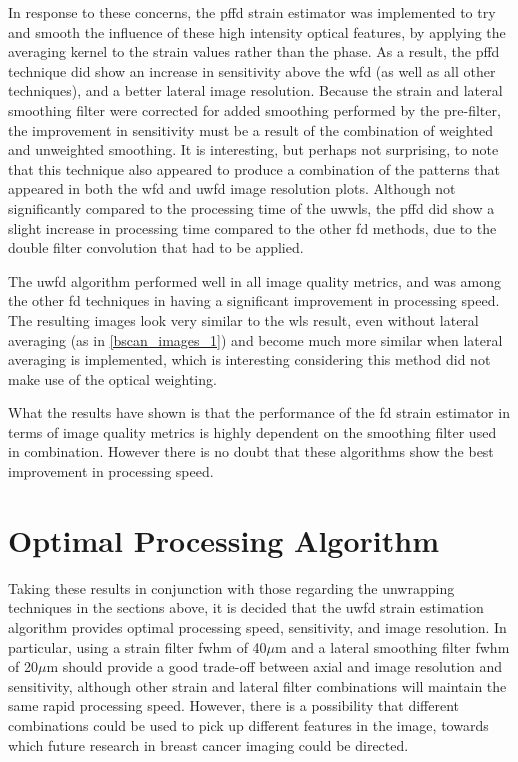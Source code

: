 In response to these concerns, the \ac{pffd} strain estimator was implemented to try and smooth the influence of these high intensity optical features, by applying the averaging kernel to the strain values rather than the phase. As a result, the \ac{pffd} technique did show an increase in sensitivity above the \ac{wfd} (as well as all other techniques), and a better lateral image resolution. Because the strain and lateral smoothing filter were corrected for added smoothing performed by the pre-filter, the improvement in sensitivity must be a result of the combination of weighted and unweighted smoothing. It is interesting, but perhaps not surprising, to note that this technique also appeared to produce a combination of the patterns that appeared in both the \ac{wfd} and \ac{uwfd} image resolution plots. Although not significantly compared to the processing time of the \ac{uwwls}, the \ac{pffd} did show a slight increase in processing time compared to the other \ac{fd} methods, due to the double filter convolution that had to be applied.

The \ac{uwfd} algorithm performed well in all image quality metrics, and was among the other \ac{fd} techniques in having a significant improvement in processing speed. The resulting images look very similar to the \ac{wls} result, even without lateral averaging (as in \autoref{bscan_images_1}) and become much more similar when lateral averaging is implemented, which is interesting considering this method did not make use of the optical weighting. 

What the results have shown is that the performance of the \ac{fd} strain estimator in terms of image quality metrics is highly dependent on the smoothing filter used in combination. However there is no doubt that these algorithms show the best improvement in processing speed. 

\section{Optimal Processing Algorithm}

Taking these results in conjunction with those regarding the unwrapping techniques in the sections above, it is decided that the \ac{uwfd} strain estimation algorithm provides optimal processing speed, sensitivity, and image resolution. In particular, using a strain filter \ac{fwhm} of 40$\mu$m and a lateral smoothing filter \ac{fwhm} of 20$\mu$m should provide a good trade-off between axial and image resolution and sensitivity, although other strain and lateral filter combinations will maintain the same rapid processing speed. However, there is a possibility that different combinations could be used to pick up different features in the image, towards which future research in breast cancer imaging could be directed.

